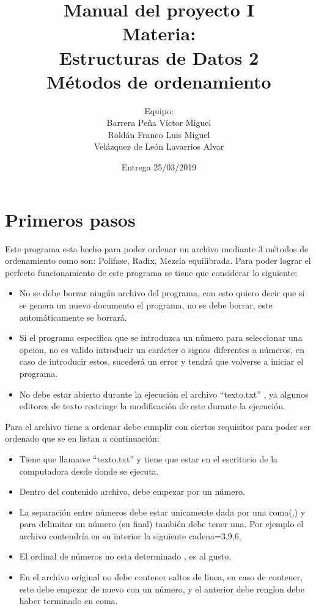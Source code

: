 \documentclass[12pt]{report}
\title{Manual del proyecto I \\ Materia: \\Estructuras de Datos 2\\ 
\large Métodos de ordenamiento}
\author{
	Equipo:\\
	Barrera Peña Víctor Miguel \\
	Roldán Franco Luis Miguel \\
	Velázquez de León Lavarrios Alvar 
}
\date{Entrega 25/03/2019}
\begin{document}
	\maketitle
	\chapter{Primeros pasos}
	Este programa  esta hecho para poder ordenar un archivo mediante 3 métodos de ordenamiento como son: Polifase, Radix, Mezcla equilibrada.
	Para poder lograr el perfecto funcionamiento de este programa se tiene que considerar lo siguiente:
	\begin{itemize}
		\item No se debe borrar ningún archivo del programa, con esto quiero decir que si se genera un nuevo documento el programa, no se debe borrar, este automáticamente se borrará.
		\item Si el programa especifica que se introduzca un número para seleccionar una opcion, no es valido introducir un carácter o signos diferentes a números, en caso de introducir estos, sucederá un error y tendrá que volverse a iniciar el programa.
		\item No debe estar abierto durante la ejecución el archivo ``texto.txt'' , ya algunos editores de texto restringe la modificación de este durante la ejecución.
	\end{itemize}
	Para el archivo tiene a ordenar debe cumplir con ciertos requisitos para poder ser ordenado que se en listan a continuación:
	\begin{itemize}
		\item Tiene que llamarse ``texto.txt'' y tiene que estar en el escritorio de la computadora desde donde se ejecuta.
		\item Dentro del contenido  archivo, debe empezar por un número.
		\item La separación entre  números debe estar unicamente dada por una coma(,) y para delimitar un número (su final) también debe tener una. Por ejemplo el archivo contendría en su interior la siguiente cadena={3,9,6,}
		\item El ordinal de números no esta determinado , es al gusto. 
		\item En el archivo original no debe contener saltos de linea, en caso de contener, este debe empezar de nuevo con un número, y el anterior debe renglon debe haber terminado en coma.
	\end{itemize}
	
\end{document}
